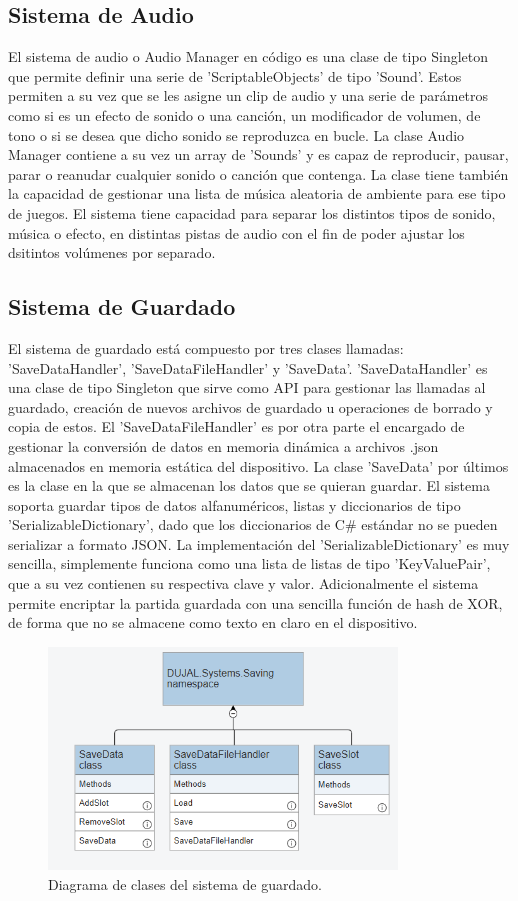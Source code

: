 \subsection{Sistema de Audio}
El sistema de audio o Audio Manager en código es una clase de tipo Singleton que permite definir una serie de 'ScriptableObjects' de tipo 'Sound'. Estos permiten a su vez que 
se les asigne un clip de audio y una serie de parámetros como si es un efecto de sonido o una canción, un modificador de volumen, de tono o si se desea que dicho sonido 
se reproduzca en bucle. La clase Audio Manager contiene a su vez un array de 'Sounds' y es capaz de reproducir, pausar, parar o reanudar cualquier sonido o canción que contenga. 
La clase tiene también la capacidad de gestionar una lista de música aleatoria de ambiente para ese tipo de juegos. El sistema tiene capacidad para separar los distintos tipos de 
sonido, música o efecto, en distintas pistas de audio con el fin de poder ajustar los dsitintos volúmenes por separado.    

\subsection{Sistema de Guardado}
El sistema de guardado está compuesto por tres clases llamadas: 'SaveDataHandler', 'SaveDataFileHandler' y 'SaveData'. 'SaveDataHandler' es una clase de tipo Singleton que 
sirve como API para gestionar las llamadas al guardado, creación de nuevos archivos de guardado u operaciones de borrado y copia de estos. El 'SaveDataFileHandler' es por 
otra parte el encargado de gestionar la conversión de datos en memoria dinámica a archivos .json almacenados en memoria estática del dispositivo. La clase 'SaveData' por últimos
es la clase en la que se almacenan los datos que se quieran guardar. El sistema soporta guardar tipos de datos alfanuméricos, listas y diccionarios de tipo 
'SerializableDictionary', dado que los diccionarios de C\# estándar no se pueden serializar a formato JSON. La implementación del 'SerializableDictionary' es muy sencilla, 
simplemente funciona como una lista de listas de tipo 'KeyValuePair', que a su vez contienen su respectiva clave y valor. Adicionalmente el sistema permite encriptar la 
partida guardada con una sencilla función de hash de XOR, de forma que no se almacene como texto en claro en el dispositivo.  

\begin{figure}[H]
  \centering
    \includegraphics[width=350px,clip=true]{Saving.png}
  \caption{Diagrama de clases del sistema de guardado.}
  \label{fig:savinguml}
\end{figure}


